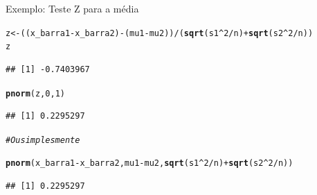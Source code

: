 \documentclass{beamer}\usepackage[]{graphicx}\usepackage[]{color}
\makeatletter
\newcommand{\hlnum}[1]{\textcolor[rgb]{0.686,0.059,0.569}{#1}}%
\newcommand{\hlcom}[1]{\textcolor[rgb]{0.678,0.584,0.686}{\textit{#1}}}%
\newcommand{\hlopt}[1]{\textcolor[rgb]{0,0,0}{#1}}%
\newcommand{\hlstd}[1]{\textcolor[rgb]{0.345,0.345,0.345}{#1}}%
\newcommand{\hlkwb}[1]{\textcolor[rgb]{0.69,0.353,0.396}{#1}}%
\newcommand{\hlkwd}[1]{\textcolor[rgb]{0.737,0.353,0.396}{\textbf{#1}}}%
\newenvironment{kframe}{%
 \def\at@end@of@kframe{}%
 \ifinner\ifhmode%
  \def\at@end@of@kframe{\end{minipage}}%
  \begin{minipage}{\columnwidth}%
 \fi\fi%
 \def\FrameCommand##1{\hskip\@totalleftmargin \hskip-\fboxsep
 \colorbox{shadecolor}{##1}\hskip-\fboxsep
     \hskip-\linewidth \hskip-\@totalleftmargin \hskip\columnwidth}%
 \MakeFramed {\advance\hsize-\width
   \@totalleftmargin\z@ \linewidth\hsize
   \@setminipage}}%
 {\par\unskip\endMakeFramed%
 \at@end@of@kframe}
\newenvironment{knitrout}{}{} %
\renewenvironment{knitrout}{\setlength{\topsep}{0mm}}{}
\makeatother
\begin{document}
\begin{frame}[fragile]{Exemplo: Teste Z para a média}

\begin{knitrout}\tiny
{}\color{fgcolor}\begin{kframe}
\begin{alltt}
\hlstd{z} \hlkwb{<-} \hlstd{((x_barra1}\hlopt{-}\hlstd{x_barra2)}\hlopt{-}\hlstd{(mu1}\hlopt{-}\hlstd{mu2))}\hlopt{/}\hlstd{(}\hlkwd{sqrt}\hlstd{(s1}\hlopt{^}\hlnum{2}\hlopt{/}\hlstd{n)}\hlopt{+}\hlkwd{sqrt}\hlstd{(s2}\hlopt{^}\hlnum{2}\hlopt{/}\hlstd{n))}
\hlstd{z}
\end{alltt}
\begin{verbatim}
## [1] -0.7403967
\end{verbatim}
\begin{alltt}
\hlkwd{pnorm}\hlstd{(z,}\hlnum{0}\hlstd{,}\hlnum{1}\hlstd{)}
\end{alltt}
\begin{verbatim}
## [1] 0.2295297
\end{verbatim}
\begin{alltt}
\hlcom{# Ou simplesmente}

\hlkwd{pnorm}\hlstd{(x_barra1}\hlopt{-}\hlstd{x_barra2,mu1}\hlopt{-}\hlstd{mu2,}\hlkwd{sqrt}\hlstd{(s1}\hlopt{^}\hlnum{2}\hlopt{/}\hlstd{n)}\hlopt{+}\hlkwd{sqrt}\hlstd{(s2}\hlopt{^}\hlnum{2}\hlopt{/}\hlstd{n))}
\end{alltt}
\begin{verbatim}
## [1] 0.2295297
\end{verbatim}
\end{kframe}
\end{knitrout}

\end{frame} 
\end{document}
